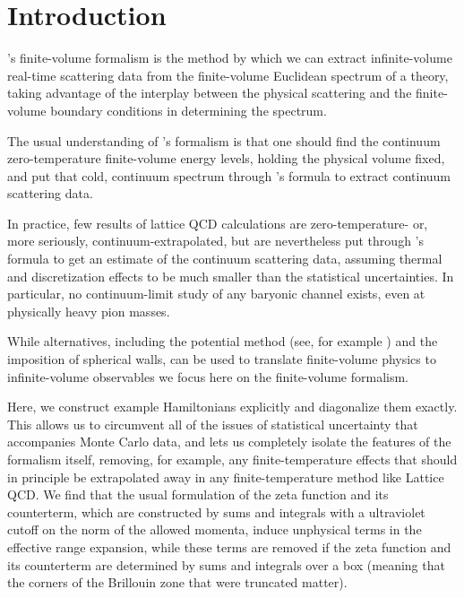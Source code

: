 \section{Introduction}\label{sec:intro}

\Luscher's finite-volume formalism\cite{Hamber198399,luscher:1986I,luscher:1986II,wiese1989,Luscher1991,Luscher1991237} is the method by which we can extract infinite-volume real-time scattering data from the finite-volume Euclidean spectrum of a theory, taking advantage of the interplay between the physical scattering and the finite-volume boundary conditions in determining the spectrum.

The usual understanding of \Luscher's formalism is that one should find the continuum zero-temperature finite-volume energy levels, holding the physical volume fixed, and put that cold, continuum spectrum through \Luscher's formula to extract continuum scattering data.

In practice, few results of lattice QCD calculations are zero-temperature- or, more seriously, continuum-extrapolated, but are nevertheless put through \Luscher's formula to get an estimate of the continuum scattering data, assuming thermal and discretization effects to be much smaller than the statistical uncertainties.
In particular, no continuum-limit study of any baryonic channel exists, even at physically heavy pion masses.

While alternatives, including the potential method (see, for example ) and the imposition of spherical walls\cite{Borasoy:2007vy,Borasoy:2007vi,Lee:2008fa,Epelbaum:2008vj,Epelbaum:2010xt,Elhatisari:2015iga,Elhatisari:2016owd,Elhatisari:2016hby,Klein:2018lqz,Li:2019ldq,Bovermann:2019jbt}, can be used to translate finite-volume physics to infinite-volume observables we focus here on the \Luscher finite-volume formalism.

Here, we construct example Hamiltonians explicitly and diagonalize them exactly.
This allows us to circumvent all of the issues of statistical uncertainty that accompanies Monte Carlo data, and lets us completely isolate the features of the formalism itself, removing, for example, any finite-temperature effects that should in principle be extrapolated away in any finite-temperature method like Lattice QCD.
We find that the usual formulation of the \Luscher zeta function and its counterterm, which are constructed by sums and integrals with a ultraviolet cutoff on the norm of the allowed momenta, induce unphysical terms in the effective range expansion, while these terms are removed if the zeta function and its counterterm are determined by sums and integrals over a box (meaning that the corners of the Brillouin zone that were truncated matter).

